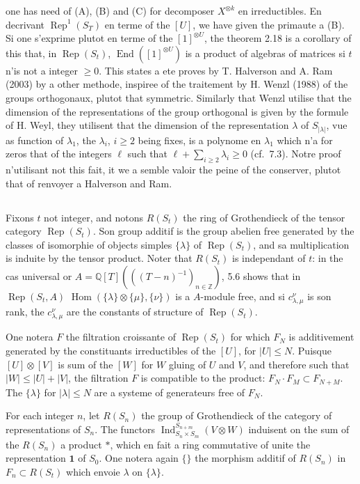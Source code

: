 \documentclass[11pt,a4paper]{article}
\theoremstyle{plain}
\theoremstyle{definition}
\DeclareMathOperator{\Hom}{Hom}
\DeclareMathOperator{\End}{End}
\DeclareMathOperator{\Ind}{Ind}
\DeclareMathOperator{\Rep}{Rep}
\newcommand{\Z}{\mathbb{Z}}
\newcommand{\Q}{\mathbb{Q}}
\begin{document}
one has need of (A), (B) and (C) for decomposer $X^{\otimes k}$ en irreductibles. En decrivant $\Rep^1(S_T)$ en terme of the $[U]$, we have given the primaute a (B). Si one s'exprime plutot en terme of the $[1]^{\otimes U}$, the theorem 2.18 is a corollary of this that, in $\Rep(S_t)$, $\End([1]^{\otimes U})$ is a product of algebras of matrices si $t$ n'is not a integer $\geq 0$. This states a ete proves by T. Halverson and A. Ram (2003) by a other methode, inspiree of the traitement by H. Wenzl (1988) of the groups orthogonaux, plutot that symmetric. Similarly that Wenzl utilise that the dimension of the representations of the group orthogonal is given by the formule of H. Weyl, they utilisent that the dimension of the representation $\lambda$ of $S_{|\lambda|}$, vue as function of $\lambda_1$, the $\lambda_i$, $i \geq 2$ being fixes,
is a polynome en $\lambda_1$ which n'a for zeros that of the integers $\ell$ such that $\ell + \sum_{i \geq 2} \lambda_i \geq 0$ (cf.~7.3). Notre proof n'utilisant not this fait, it we a semble valoir the peine of the conserver, plutot that of renvoyer a Halverson and Ram.

\subsection{}
Fixons $t$ not integer, and notons $R(S_t)$ the ring of Grothendieck of the tensor category $\Rep(S_t)$. Son group additif is the group abelien free generated by the classes of isomorphie of objects simples $\{\lambda\}$ of $\Rep(S_t)$, and sa multiplication is induite by the tensor product. Noter that $R(S_t)$ is independant of $t$: in the cas universal or $A = \Q[T](((T-n)^{-1})_{n \in \Z})$, 5.6 shows that in $\Rep(S_t, A)$ $\Hom(\{\lambda\} \otimes \{\mu\}, \{\nu\})$ is a $A$-module free, and si $c^{\nu}_{\lambda,\mu}$ is son rank, the $c^{\nu}_{\lambda,\mu}$ are the constants of structure of $\Rep(S_t)$.

One notera $F$ the filtration croissante of $\Rep(S_t)$ for which $F_N$ is additivement generated by the constituants irreductibles of the $[U]$, for $|U| \leq N$. Puisque $[U] \otimes [V]$ is sum of the $[W]$ for $W$ gluing of $U$ and $V$, and therefore such that $|W| \leq |U| + |V|$, the filtration $F$ is compatible to the product: $F_N \cdot F_M \subset F_{N+M}$. The $\{\lambda\}$ for $|\lambda| \leq N$ are a systeme of generateurs free of $F_N$.

For each integer $n$, let $R(S_n)$ the group of Grothendieck of the category of representations of $S_n$. The functors $\Ind^{S_{n+m}}_{S_n \times S_m}(V \otimes W)$ induisent on the sum of the $R(S_n)$ a product $\ast$, which en fait a ring commutative of unite the representation $\mathbf{1}$ of $S_0$. One notera again $\{\}$ the morphism additif of $R(S_n)$ in $F_n \subset R(S_t)$ which envoie $\lambda$ on $\{\lambda\}$.
\end{document}
